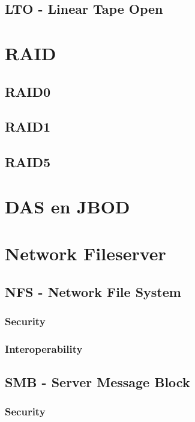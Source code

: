 \documentclass[a4paper,12pt,twoside,openright,titlepage]{book}
\begin{document}
\section{LTO - Linear Tape Open}

\chapter{RAID}

\section{RAID0}

\section{RAID1}

\section{RAID5}


\chapter{DAS en JBOD}


\chapter{Network Fileserver}

\section{NFS - Network File System}

\subsection{Security}

\subsection{Interoperability}

\section{SMB - Server Message Block}

\subsection{Security}

\end{document}
